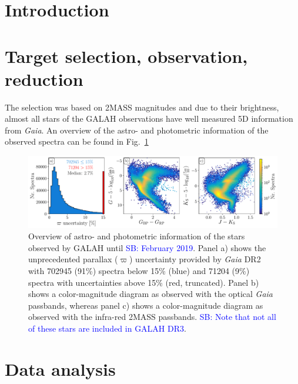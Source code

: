\documentclass[fleqn,usenatbib,useAMS]{mnras}
\newcommand{\Gaia}{\textit{Gaia}\xspace}
\newcommand\SB[1]{\textcolor{blue}{SB: #1}}
\begin{document}

\section{Introduction} \label{sec:introduction}

\section{Target selection, observation, reduction} \label{sec:selection_observation_reduction}

The selection was based on 2MASS \citep{Skrutskie2006} magnitudes and due to their brightness, almost all stars of the GALAH observations have well measured 5D information from \Gaia \citep{Brown2018, Lindegren2018}. An overview of the astro- and photometric information of the observed spectra can be found in Fig.~\ref{fig:plot_parallax_quality_and_cmds}

\begin{figure}
\centering
\includegraphics[width=\textwidth]{figures/plot_parallax_quality_and_cmds.pdf}
\caption{Overview of astro- and photometric information of the stars observed by GALAH until \SB{February 2019}. Panel a) shows the unprecedented parallax ($\varpi$) uncertainty provided by \Gaia DR2 with 702945 (91\%) spectra below 15\% (blue) and 71204 (9\%) spectra with uncertainties above 15\% (red, truncated). Panel b) shows a color-magnitude diagram as observed with the optical \Gaia passbands, whereas panel c) shows a color-magnitude diagram as observed with the infra-red 2MASS passbands. \SB{Note that not all of these stars are included in GALAH DR3}.}
\label{fig:plot_parallax_quality_and_cmds}
\end{figure}

\section{Data analysis} \label{sec:analysis}
\end{document}
